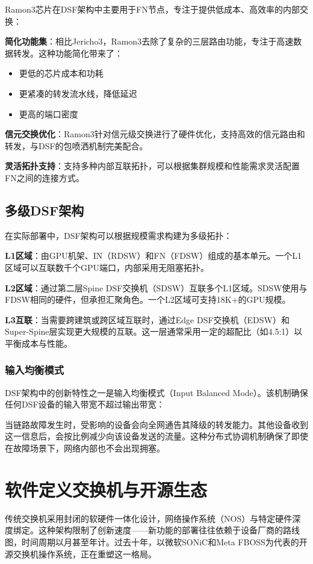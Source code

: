 Ramon3芯片在DSF架构中主要用于FN节点，专注于提供低成本、高效率的内部交换：

\textbf{简化功能集}：相比Jericho3，Ramon3去除了复杂的三层路由功能，专注于高速数据转发。这种功能简化带来了：
\begin{itemize}
    \item 更低的芯片成本和功耗
    \item 更紧凑的转发流水线，降低延迟
    \item 更高的端口密度
\end{itemize}

\textbf{信元交换优化}：Ramon3针对信元级交换进行了硬件优化，支持高效的信元路由和转发，与DSF的包喷洒机制完美配合。

\textbf{灵活拓扑支持}：支持多种内部互联拓扑，可以根据集群规模和性能需求灵活配置FN之间的连接方式。

\subsection{多级DSF架构}

在实际部署中，DSF架构可以根据规模需求构建为多级拓扑：

\textbf{L1区域}：由GPU机架、IN（RDSW）和FN（FDSW）组成的基本单元。一个L1区域可以互联数千个GPU端口，内部采用无阻塞拓扑。

\textbf{L2区域}：通过第二层Spine DSF交换机（SDSW）互联多个L1区域。SDSW使用与FDSW相同的硬件，但承担汇聚角色。一个L2区域可支持18K+的GPU规模。

\textbf{L3互联}：当需要跨建筑或跨区域互联时，通过Edge DSF交换机（EDSW）和Super-Spine层实现更大规模的互联。这一层通常采用一定的超配比（如4.5:1）以平衡成本与性能。

\subsubsection{输入均衡模式}

DSF架构中的创新特性之一是输入均衡模式（Input Balanced Mode）。该机制确保任何DSF设备的输入带宽不超过输出带宽：

当链路故障发生时，受影响的设备会向全网通告其降级的转发能力。其他设备收到这一信息后，会按比例减少向该设备发送的流量。这种分布式协调机制确保了即使在故障场景下，网络内部也不会出现拥塞。

\section{软件定义交换机与开源生态}

传统交换机采用封闭的软硬件一体化设计，网络操作系统（NOS）与特定硬件深度绑定。这种架构限制了创新速度——新功能的部署往往依赖于设备厂商的路线图，时间周期以月甚至年计。过去十年，以微软SONiC和Meta FBOSS为代表的开源交换机操作系统，正在重塑这一格局。

